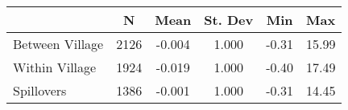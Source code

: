 \begin{tabular}{l*{5}{c}}\hline&\multicolumn{1}{c}{N}&\multicolumn{1}{c}{Mean}&\multicolumn{1}{c}{St. Dev}&\multicolumn{1}{c}{Min}&\multicolumn{1}{c}{Max}\\ \hline 
Between Village & 2126 & -0.004 & 1.000 & -0.31 & 15.99 \\
Within Village & 1924 & -0.019 & 1.000 & -0.40 & 17.49 \\
Spillovers & 1386 & -0.001 & 1.000 & -0.31 & 14.45 \\
\hline \end{tabular}
